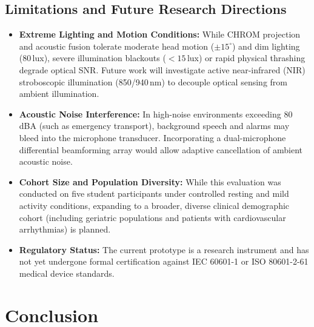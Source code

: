 \documentclass[journal]{IEEEtran}
\begin{document}
\subsection{Limitations and Future Research Directions}
\begin{itemize}
  \item \textbf{Extreme Lighting and Motion Conditions:} While CHROM projection and acoustic fusion tolerate moderate head motion ($\pm 15^\circ$) and dim lighting (80\,lux), severe illumination blackouts ($<15$\,lux) or rapid physical thrashing degrade optical SNR. Future work will investigate active near-infrared (NIR) stroboscopic illumination (850/940\,nm) to decouple optical sensing from ambient illumination.
  \item \textbf{Acoustic Noise Interference:} In high-noise environments exceeding 80\,dBA (such as emergency transport), background speech and alarms may bleed into the microphone transducer. Incorporating a dual-microphone differential beamforming array would allow adaptive cancellation of ambient acoustic noise.
  \item \textbf{Cohort Size and Population Diversity:} While this evaluation was conducted on five student participants under controlled resting and mild activity conditions, expanding to a broader, diverse clinical demographic cohort (including geriatric populations and patients with cardiovascular arrhythmias) is planned.
  \item \textbf{Regulatory Status:} The current prototype is a research instrument and has not yet undergone formal certification against IEC 60601-1 or ISO 80601-2-61 medical device standards.
\end{itemize}

\section{Conclusion}
\label{sec:conclusion}
\end{document}
